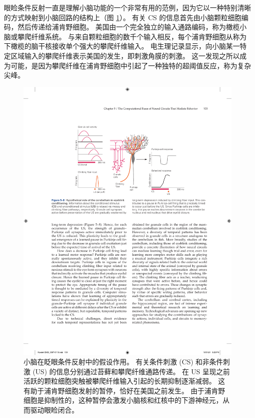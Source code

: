 眼睑条件反射一直是理解小脑功能的一个非常有用的范例，因为它以一种特别清晰的方式映射到小脑回路的结构上（图 \ref{fig:5_8}）。 
有关 CS 的信息首先由小脑颗粒细胞编码，然后传递给浦肯野细胞。 
美国由一个完全独立的输入通路编码，称为橄榄小脑或攀爬纤维系统。 
与来自颗粒细胞的数千个输入相反，每个浦肯野细胞从称为下橄榄的脑干核接收单个强大的攀爬纤维输入。 
电生理记录显示，向小脑某一特定区域输入的攀爬纤维表示美国的发生，即刺激角膜的刺激。 
这一发现之所以成为可能，是因为攀爬纤维在浦肯野细胞中引起了一种独特的超阈值反应，称为复杂尖峰。


\begin{figure}[htbp]
	\centering
	\includegraphics[width=1.0\linewidth]{chap05/fig_5_8}
	\caption{小脑在眨眼条件反射中的假设作用。 
		有关条件刺激 (CS) 和非条件刺激 (US) 的信息分别通过苔藓和攀爬纤维通路传递。 
		在 US 呈现之前活跃的颗粒细胞突触被攀爬纤维输入引起的长期抑制逐渐减弱。 
		这有助于浦肯野细胞发射的暂停，恰好在美国之前发生。 
		由于浦肯野细胞是抑制性的，这种暂停会激发小脑核和红核中的下游神经元，从而驱动眼睑闭合。}
	\label{fig:5_8}
\end{figure}


